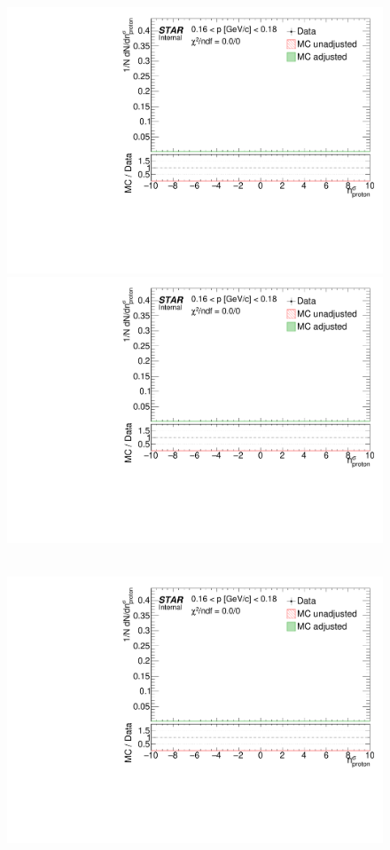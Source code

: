 \begin{figure}[ht]
{  \includegraphics[width=\linewidth,page=14]{graphics/dedx/nSigmaProton_DataVsMC.pdf}\\[3pt]
  \includegraphics[width=\linewidth,page=16]{graphics/dedx/nSigmaProton_DataVsMC.pdf}
}~
\parbox{0.495\textwidth}{
  \centering
  \includegraphics[width=\linewidth,page=11]{graphics/dedx/nSigmaProton_DataVsMC.pdf}\\[3pt]
}
\end{figure}
